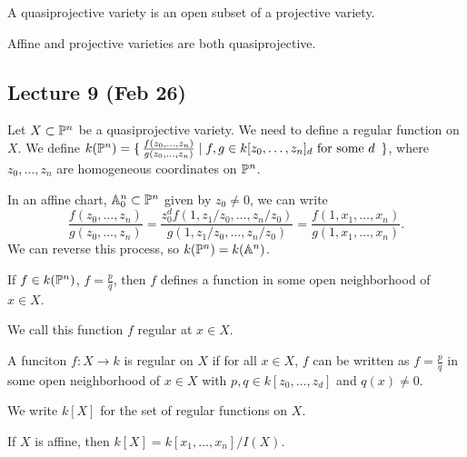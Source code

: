 \documentclass[twoside, 10pt]{article}
\begin{document}
    \begin{defn}
        A quasiprojective variety is an open subset of a projective variety.
    \end{defn}

    \begin{exm}
        Affine and projective varieties are both quasiprojective.
    \end{exm}

    \subsection{Lecture 9 (Feb 26)}
    Let $X \subset \P^n$ be a quasiprojective variety. We need to define a regular function on $X$. We define $k(\P^n) = \set{\frac{f(z_0, \ldots, z_n)}{g(z_0, \ldots, z_n)} | f,g \in k[z_0, \ldots, z_n]_d \text{ for some $d$ }}$, where $z_0, \ldots, z_n$ are homogeneous coordinates on $\P^n$.

    \begin{rmk}
        In an affine chart, $\A_0^n \subset \P^n$ given by $z_0 \neq 0$, we can write
    \[ \frac{f(z_0, \ldots, z_n)}{g(z_0, \ldots, z_n)} = \frac{z_0^df(1,z_1/z_0, \ldots, z_n/z_0)}{g(1, z_1/z_0, \ldots, z_n/z_0)} = \frac{f(1, x_1, \ldots, x_n)}{g(1, x_1, \ldots, x_n)}. \]
        We can reverse this process, so $k(\P^n) = k(\A^n)$.
    \end{rmk}

    If $f \in k(\P^n)$, $f = \frac{p}{q}$, then $f$ defines a function in some open neighborhood of $x \in X$.
    \begin{defn}
        We call this function $f$ regular at $x \in X$.
    \end{defn}

    \begin{defn}
        A funciton $f:X \to k$ is regular on $X$ if for all $x \in X$, $f$ can be written as $f = \frac{p}{q}$ in some open neighborhood of $x \in X$ with $p,q \in k[z_0, \ldots, z_d]$ and $q(x) \neq 0$.
    \end{defn}

    \begin{rmk}
        We write $k[X]$ for the set of regular functions on $X$.
    \end{rmk}

    \begin{rmk}
        If $X$ is affine, then $k[X] = k[x_1, \ldots, x_n]/I(X)$.
    \end{rmk}
\end{document}

